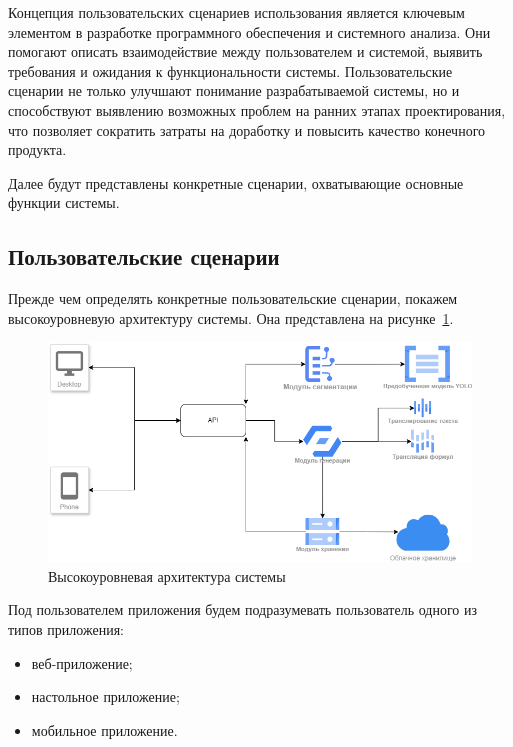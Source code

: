 Концепция пользовательских сценариев использования является ключевым элементом в разработке программного обеспечения и системного анализа. 
Они помогают описать взаимодействие между пользователем и системой, выявить требования и ожидания к функциональности системы. 
Пользовательские сценарии не только улучшают понимание разрабатываемой системы, но и способствуют выявлению возможных проблем на ранних этапах проектирования, что позволяет сократить затраты на доработку и повысить качество конечного продукта.

Далее будут представлены конкретные сценарии, охватывающие основные функции системы.
\subsection{Пользовательские сценарии}
Прежде чем определять конкретные пользовательские сценарии, покажем высокоуровневую архитектуру системы. Она представлена на рисунке~\ref{sys_architecture}.

\begin{figure}
    \includegraphics[scale=0.5]{img/use_cases/architecture.png}
    \caption{Высокоуровневая архитектура системы}
    \label{sys_architecture}
\end{figure}

Под пользователем приложения будем подразумевать пользователь одного из типов приложения:
\begin{itemize}
    \item веб-приложение;
    \item настольное приложение;
    \item мобильное приложение.
\end{itemize}

